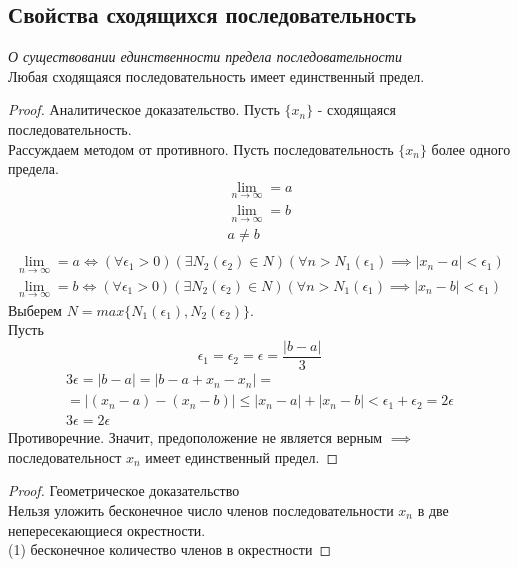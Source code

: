
\subsection{Свойства сходящихся последовательность}

\begin{theorem}
  \textit{О существовании единственности предела последовательности} \\
  Любая сходящаяся последовательность имеет единственный предел.
\end{theorem}
\begin{proof} Аналитическое доказательство.
  Пусть $\{x_{n}\} $ - сходящаяся последовательность. \\
  Рассуждаем методом от противного. Пусть последовательность $\{x_{n}\} $ более одного предела.
  \begin{gather*}
    \lim_{n \to \infty} = a \\
    \lim_{n \to \infty} = b \\
    a \neq b \\
  \end{gather*}
  \begin{gather}
    \lim_{n \to \infty} = a \iff (\forall \epsilon_1 > 0)(\exists N_2(\epsilon_2) \in N)(\forall n > N_1(\epsilon_1) \implies |x_{n} - a| < \epsilon_1) \\
    \lim_{n \to \infty} = b \iff (\forall \epsilon_1 > 0)(\exists N_2(\epsilon_2) \in N)(\forall n > N_1(\epsilon_1) \implies |x_{n} - b| < \epsilon_1)  
  \end{gather} 
  Выберем $N=max \{N_1\left( \epsilon_1 \right) , N_2\left( \epsilon_2 \right) \}$. \\
  Пусть 
  \[
    \epsilon_1 = \epsilon_2 = \epsilon = \frac{|b - a|}{3}
  \]
  \begin{gather*}
  3 \epsilon = |b - a| = |b - a + x_{n} - x_{n}| = \\
  = |(x_{n} - a) - (x_{n} - b)| \le |x_{n} - a| + |x_{n} - b| < \epsilon_1 + \epsilon_2 = 2 \epsilon \\
  3 \epsilon = 2 \epsilon
  \end{gather*}
  Противоречние. Значит, предоположение не является верным $\implies$ последовательност $x_{n}$ имеет единственный предел.
\end{proof}

\begin{proof} Геометрическое доказательство\\
  Нельзя уложить бесконечное число членов последовательности $x_{n}$ в две непересекающиеся окрестности. \\
  (1) бесконечное количество членов в окрестности 
\end{proof}

